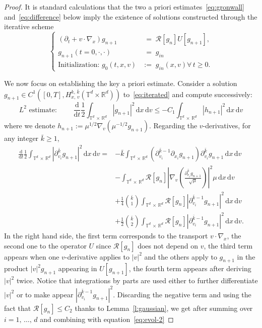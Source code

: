 \documentclass[AHL,Unicode,longabstracts,published]{cedram}
\newcommand{\R}{\mathbb{R}}
\newcommand{\T}{\mathbb{T}}
\newcommand*\fR{\mathcal{R}}
\newcommand\dt{{\frac{\mathrm d}{\mathrm dt}}}
\newcommand{\dd}{{\, \mathrm d}}
\let\oldforall\forall
\renewcommand*{\forall}{\mathrel{\oldforall}}
\begin{document}
\begin{proof}
It is standard calculations that the two a priori estimates~\eqref{eq:gronwall} and~\eqref{eq:difference} below imply the existence of solutions constructed through the iterative scheme
\begin{equation}\label{eq:iterated}
\begin{cases}
(\partial_t + v \cdot \nabla_x) g_{n+1} &\; =\; \fR [g_n] U[g_{n+1}],\\
 g_{n+1}(t=0,\cdot,\cdot)&\; =\; g_{in} \\
\text{Initialization: } g_0(t,x,v) & :=\; g_{in}(x,v)  \forall \, t \ge 0.
\end{cases}
\end{equation}

We now focus on establishing the key a priori estimate. Consider a solution $g_{n+1} \in C^1([0,T],H^{k,\,\bar k}_{x,\,v}(\T^d \times \R^d))$ to~\eqref{eq:iterated} and compute successively:
\begin{equation}\label{eq:evol-2}
L^2 \text{ estimate: } \qquad \dt \frac{1}2 \int_{\T^d\, \times\,\R^d} | g_{n+1}|^2\dd x \dd v \le - C_1
\int_{\T^d\,\times\,\R^d} |h_{n+1}|^2 \dd x \dd v
\end{equation}
where we denote $h_{n+1}:=\mu^{1/2} \nabla_v (\mu^{-1/2} g_{n+1})$. Regarding the $v$-derivatives, for any integer ${\bar k} \ge 1$,
\begin{align*}
\dt \frac12 \int_{\T^d\,\times\,\R^d} \left|\partial^{{\bar k}}_{v_i} g_{n+1}\right|^2 \dd x \dd v = &- {\bar k} \int_{\T^d\, \times\,\R^d} \left(\partial^{{\bar k}-1} _{v_i} \partial_{x_i} g_{n+1}\right) \partial^{{\bar k}}_{v_i} g_{n+1} \dd x \dd v \\
&- \int_{\T^d\,\times\,\R^d} \fR[g_n] \left| \nabla_v \left(\frac{\partial^{{\bar k}} _{v_i} g_{n+1}}{\sqrt \mu} \right) \right|^2 \mu \dd x \dd v\\
& + \frac14 \binom{{\bar k}}1 \int_{\T^d\,\times\,\R^d} \fR[g_n] \left| \partial^{{\bar k} - 1} _{v_i} g_{n+1} \right|^2 \dd x \dd v \\
& + \frac12 \binom{{\bar k}}2 \int_{\T^d\,\times\,\R^d} \fR[g_n] \left| \partial^{{\bar k}-1} _{v_i} g_{n+1} \right|^2 \dd x \dd v.
\end{align*}
In the right hand side, the first term corresponds to the transport $v \cdot \nabla_x$, the second one to the operator $U$ since $\fR[g_n]$ does not depend on $v$, the third term appears when one $v$-derivative applies to $|v|^2$ and the others apply to $g_{n+1}$ in the product $|v|^2 g_{n+1}$ appearing in $U[g_{n+1}]$, the fourth term appears after deriving $|v|^2$ twice. Notice that integrations by parts are used either to further differentiate $|v|^2$ or to make appear $|\partial_{v_i}^{{\bar k}-1}g_{n+1}|^2$. Discarding the negative term and using the fact that $\fR[g_n] \le C_2$ thanks to Lemma~\ref{l:gaussian}, we get after summing over $i =1,\,\dots,\,d$ and combining with equation~\eqref{eq:evol-2}

\end{proof}
\end{document}
